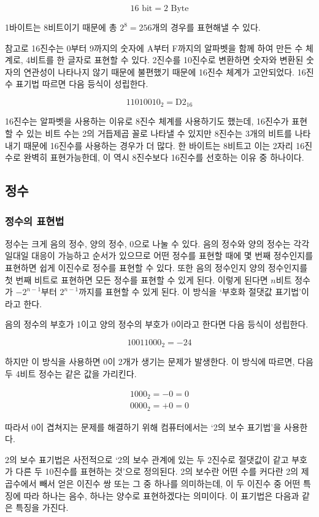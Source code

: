 \documentclass{article}
\begin{document}
$$
16 \text{ bit} = 2 \text{ Byte}
$$

1바이트는 8비트이기 때문에 총 $2^8 = 256$개의 경우를 표현해낼 수 있다.

참고로 16진수는 0부터 9까지의 숫자에 A부터 F까지의 알파벳을 함께 하여 만든 수 체계로,
4비트를 한 글자로 표현할 수 있다. 2진수를 10진수로 변환하면 숫자와 변환된 숫자의 연관성이
나타나지 않기 때문에 불편했기 때문에 16진수 체계가 고안되었다.
16진수 표기법 따르면 다음 등식이 성립한다.

$$
1101 0010_2 = \text{D2}_{16}
$$

16진수는 알파벳을 사용하는 이유로 8진수 체계를 사용하기도 했는데, 16진수가 표현할 수 있는
비트 수는 2의 거듭제곱 꼴로 나타낼 수 있지만 8진수는 3개의 비트를 나타내기 때문에 16진수를
사용하는 경우가 더 많다. 한 바이트는 8비트고 이는 2자리 16진수로 완벽히 표현가능한데, 이 역시
8진수보다 16진수를 선호하는 이유 중 하나이다.

\subsection{정수}

\subsubsection{정수의 표현법}

정수는 크게 음의 정수, 양의 정수, 0으로 나눌 수 있다. 음의 정수와 양의 정수는 각각 일대일
대응이 가능하고 순서가 있으므로 어떤 정수를 표현할 때에 몇 번째 정수인지를 표현하면 쉽게
이진수로 정수를 표현할 수 있다. 또한 음의 정수인지 양의 정수인지를 첫 번째 비트로 표현하면
모든 정수를 표현할 수 있게 된다. 이렇게 된다면 $n$비트 정수가 $-2^{n-1}$부터
$2^{n-1}$까지를 표현할 수 있게 된다. 이 방식을 `부호화 절댓값 표기법'이라고 한다.

음의 정수의 부호가 1이고 양의 정수의 부호가 0이라고 한다면 다음 등식이 성립한다.

$$
10011000_2 = -24
$$

하지만 이 방식을 사용하면 0이 2개가 생기는 문제가 발생한다. 이 방식에 따르면,
다음 두 4비트 정수는 같은 값을 가리킨다.

$$
\begin{aligned}
    1000_2 = -0 = 0 \\
    0000_2 = +0 = 0
\end{aligned}
$$

따라서 0이 겹쳐지는 문제를 해결하기 위해 컴퓨터에서는 `2의 보수 표기법'을 사용한다.

2의 보수 표기법은 사전적으로 `2의 보수 관계에 있는 두 2진수로 절댓값이 같고 부호가
다른 두 10진수를 표현하는 것'으로 정의된다. 2의 보수란 어떤 수를 커다란 2의 제곱수에서
빼서 얻은 이진수 쌍 또는 그 중 하나를 의미하는데, 이 두 이진수 중 어떤 특징에 따라
하나는 음수, 하나는 양수로 표현하겠다는 의미이다. 이 표기법은 다음과 같은 특징을 가진다.
\end{document}
